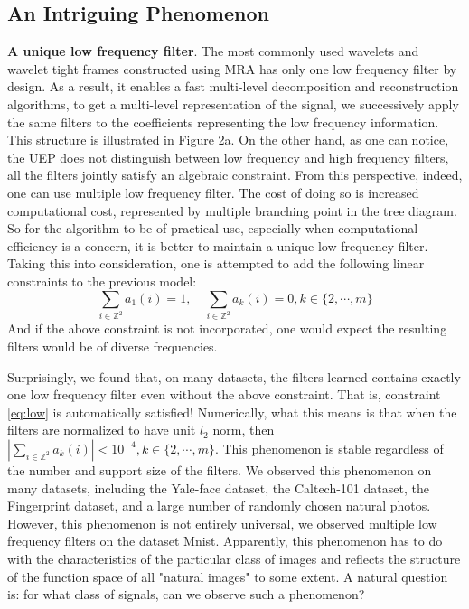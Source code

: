 \documentclass[a4paper]{article}
\begin{document}
\subsection{An Intriguing Phenomenon}
\textbf{A unique low frequency filter}. The most commonly used wavelets and wavelet tight frames constructed using MRA has only one low frequency filter by design. As a result, it enables a fast multi-level decomposition and reconstruction algorithms, to get a multi-level representation of the signal, we successively apply the same filters to the coefficients representing the low frequency information. This structure is illustrated in Figure 2a. On the other hand, as one can notice, the UEP does not distinguish between low frequency and high frequency filters, all the filters jointly satisfy an algebraic constraint. From this perspective, indeed, one can use multiple low frequency filter. The cost of doing so is increased computational cost, represented by multiple branching point in the tree diagram. So for the algorithm to be of practical use, especially when computational efficiency is a concern, it is better to maintain a unique low frequency filter. Taking this into consideration, one is attempted to add the following linear constraints to the previous model:
\begin{equation}
\label{eq:low}
\sum_{i\in\mathbb{Z}^2} a_1(i)=1,\quad \sum_{i\in \mathbb{Z}^2} a_k(i)=0, k\in\{2,\cdots,m\}
\end{equation}
And if the above constraint is not incorporated, one would expect the resulting filters would be of diverse frequencies.

Surprisingly, we found that, on many datasets, the filters learned contains exactly one low frequency filter even without the above constraint. That is, constraint \eqref{eq:low} is automatically satisfied!  Numerically, what this means is that when the filters are normalized to have unit $l_2$ norm, then $ |\sum_{i\in \mathbb{Z}^2} a_k(i)| < 10^{-4}, k\in\{2,\cdots,m\}$. This phenomenon is stable regardless of the number and support size of the filters. We observed this phenomenon on many datasets, including the Yale-face dataset, the Caltech-101 dataset, the Fingerprint dataset, and a large number of randomly chosen natural photos. However, this phenomenon is not entirely universal, we observed multiple low frequency filters on the dataset Mnist. Apparently, this phenomenon has to do with the characteristics of the particular class of images and reflects the structure of the function space of all "natural images" to some extent. A natural question is: for what class of signals, can we observe such a phenomenon?
\end{document}
